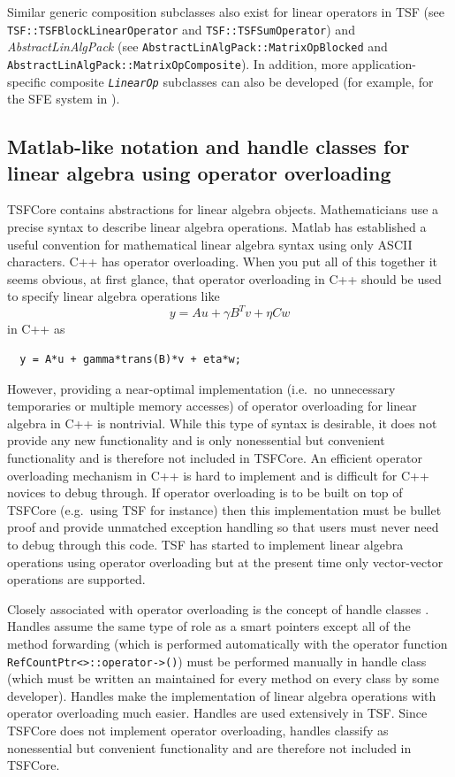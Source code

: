 Similar generic composition subclasses also exist for linear operators
in TSF (see \texttt{TSF\-::TSF\-Block\-Linear\-Operator} and
\texttt{TSF\-::TSF\-Sum\-Operator}) and \textit{AbstractLinAlgPack} (see
\texttt{Abstract\-Lin\-Alg\-Pack\-::Matrix\-Op\-Blocked} and
\texttt{Abstract\-Lin\-Alg\-Pack\-::Matrix\-Op\-Composite}).  In addition, more
application-specific composite \texttt{\textit{LinearOp}} subclasses
can also be developed (for example, for the SFE system in
\cite{ref:sfe}).

%
\subsection{Matlab-like notation and handle classes for linear algebra
using operator overloading}
\label{tsfcore:sec:operator_overloading}
%

TSFCore contains abstractions for linear algebra objects.  Mathematicians
use a precise syntax to describe linear algebra operations.  Matlab
\cite{ref:matlab} has established a useful convention for mathematical
linear algebra syntax using only ASCII characters.  C++ has operator
overloading.  When you put all of this together it seems obvious, at
first glance, that operator overloading in C++ should be used to
specify linear algebra operations like
%
\[
y = A u + \gamma B^T v + \eta C w
\]
%
in C++ as
%
\begin{verbatim}
  y = A*u + gamma*trans(B)*v + eta*w;
\end{verbatim}

{}\noindent{}However, providing a near-optimal implementation (i.e.~no
unnecessary temporaries or multiple memory accesses) of operator
overloading for linear algebra in C++ is nontrivial.  While this type
of syntax is desirable, it does not provide any new functionality and
is only nonessential but convenient functionality and is therefore not
included in TSFCore.  An efficient operator overloading mechanism in
C++ is hard to implement and is difficult for C++ novices to debug
through.  If operator overloading is to be built on top of TSFCore
(e.g.~using TSF for instance) then this implementation must be bullet
proof and provide unmatched exception handling so that users must
never need to debug through this code.  TSF has started to implement
linear algebra operations using operator overloading but at the
present time only vector-vector operations are supported.

Closely associated with operator overloading is the concept of handle
classes \cite{ref:advanced_c++_coplien}.  Handles assume the same type
of role as a smart pointers except all of the method forwarding (which
is performed automatically with the operator function
\texttt{RefCountPtr<>\-::operator->()}) must be performed manually
in handle class (which must be written an maintained for every method
on every class by some developer).  Handles make the implementation of
linear algebra operations with operator overloading much easier.
Handles are used extensively in TSF.  Since TSFCore does not implement
operator overloading, handles classify as nonessential but convenient
functionality and are therefore not included in TSFCore.


